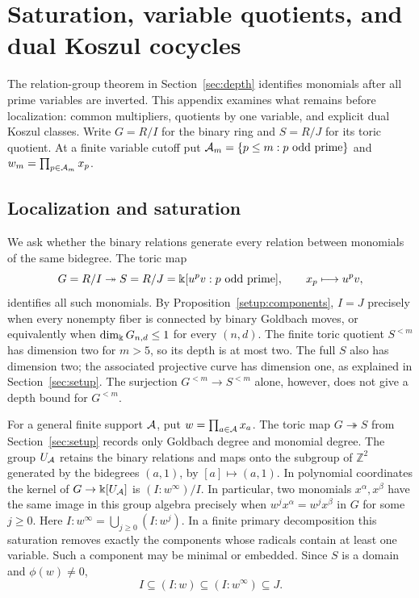 \section{Saturation, variable quotients, and dual Koszul cocycles}
\label{app:saturation}

The relation-group theorem in Section~\ref{sec:depth} identifies
monomials after all prime variables are inverted. This appendix
examines what remains before localization: common multipliers,
quotients by one variable, and explicit dual Koszul classes.
Write $G=R/I$ for the binary ring and $S=R/J$ for its toric quotient.
At a finite variable cutoff put $\mathcal A_m=\{p\le m:p\text{ odd prime}\}$
and $w_m=\prod_{p\in\mathcal A_m}x_p$.

\subsection{Localization and saturation}

We ask whether the binary relations generate every
relation between monomials of the same bidegree. The toric map
\[
 G=R/I\twoheadrightarrow S=R/J
       =\Bbbk[u^pv:p\text{ odd prime}],\qquad x_p\longmapsto u^pv,
\]
identifies all such monomials. By Proposition~\ref{setup:components},
$I=J$ precisely when every nonempty fiber is connected by binary
Goldbach moves, or equivalently when $\dim_\Bbbk G_{n,d}\le1$ for every
$(n,d)$. The finite toric quotient $S^{<m}$ has dimension two for
$m>5$, so its depth is at most two. The full $S$ also has dimension
two; the associated projective curve has dimension one, as explained
in Section~\ref{sec:setup}. The surjection $G^{<m}\to S^{<m}$ alone,
however, does not give a depth bound for $G^{<m}$.

For a general finite support $\mathcal A$, put $w=\prod_{a\in\mathcal A}x_a$.
The toric map $G\twoheadrightarrow S$ from Section~\ref{sec:setup}
records only Goldbach degree and monomial degree. The group $U_{\mathcal A}$ retains the
binary relations and maps onto the subgroup of $\mathbb Z^2$ generated
by the bidegrees $(a,1)$, by $[a]\mapsto(a,1)$. In polynomial
coordinates the kernel of $G\to\Bbbk[U_{\mathcal A}]$ is
$(I:w^\infty)/I$. In particular, two monomials $x^\alpha,x^\beta$
have the same image in this group algebra precisely when
$w^j x^\alpha=w^j x^\beta$ in $G$ for some $j\ge0$.
Here $I:w^\infty=\bigcup_{j\ge0}(I:w^j)$. In a finite primary
decomposition this saturation removes exactly the components whose
radicals contain at least one variable. Such a component may be
minimal or embedded. Since $S$ is a domain and $\phi(w)\ne0$,
\[
 I\subseteq (I:w)\subseteq (I:w^\infty)\subseteq J.
\]

